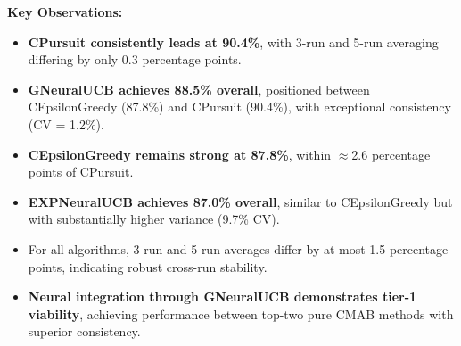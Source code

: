 \documentclass[12pt,a4paper]{article}
\newcommand{\performance}[1]{\textcolor{performancecolor}{\textbf{#1}}}
\newcommand{\legacy}[1]{\textcolor{legacycolor}{\textbf{#1}}}
\newcommand{\neural}[1]{\textcolor{neuralcolor}{\textbf{#1}}}
\begin{document}
\begin{tcolorbox}[colback=performancecolor!10,colframe=performancecolor,title=\textbf{Primary Performance Results (Aggregated Across Capacities, Environments, and Regimes)}]
\textbf{Key Observations:}
\begin{itemize}
\item \performance{CPursuit consistently leads at 90.4\%}, with 3-run and 5-run averaging differing by only 0.3 percentage points.
\item \neural{GNeuralUCB achieves 88.5\% overall}, positioned between CEpsilonGreedy (87.8\%) and CPursuit (90.4\%), with exceptional consistency (CV = 1.2\%).
\item \performance{CEpsilonGreedy remains strong at 87.8\%}, within $\approx$2.6 percentage points of CPursuit.
\item \legacy{EXPNeuralUCB achieves 87.0\% overall}, similar to CEpsilonGreedy but with substantially higher variance (9.7\% CV).
\item For all algorithms, 3-run and 5-run averages differ by at most 1.5 percentage points, indicating robust cross-run stability.
\item \neural{Neural integration through GNeuralUCB demonstrates tier-1 viability}, achieving performance between top-two pure CMAB methods with superior consistency.
\end{itemize}

\end{tcolorbox}
\end{document}
